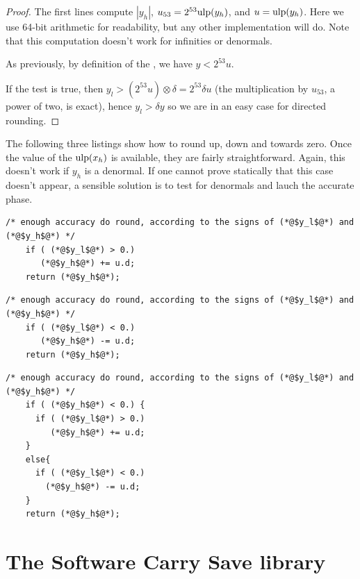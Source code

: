\begin{proof}
  The first lines compute $|y_h|$, $u_{53}=2^{53}\mbox{ulp}(y_h)$, and
  $u=\mbox{ulp}(y_h)$. Here we use 64-bit arithmetic for readability, but
  any other implementation will do. Note that this computation doesn't
  work for infinities or denormals.
  
  As previously, by definition of the \ulp, we have  $y<2^{53}u$.
  
  If the test is true, then $y_l>(2^{53}u)\otimes \delta = 
  2^{53} \delta u $ (the multiplication by $u_{53}$, a power of
  two, is exact), hence $y_l>\delta y$ so we are in an easy case for directed rounding.

\end{proof}


The following three listings show how to round up, down and towards
zero. Once the value of the $\mbox{ulp}(x_h)$ is available, they are fairly
straightforward. Again, this doesn't work if $y_h$ is a denormal. If
one cannot prove statically that this case doesn't appear, a sensible solution
is to test for denormals and lauch the accurate phase.


\begin{lstlisting}[caption={Rounding up}, firstnumber=1]
    /* enough accuracy do round, according to the signs of (*@$y_l$@*) and (*@$y_h$@*) */
    if ( (*@$y_l$@*) > 0.)
       (*@$y_h$@*) += u.d;
    return (*@$y_h$@*);
\end{lstlisting}

\begin{lstlisting}[caption={Rounding down}, firstnumber=1]
    /* enough accuracy do round, according to the signs of (*@$y_l$@*) and (*@$y_h$@*) */
    if ( (*@$y_l$@*) < 0.)
       (*@$y_h$@*) -= u.d;
    return (*@$y_h$@*);
\end{lstlisting}


\begin{lstlisting}[caption={Rounding towards zero}, firstnumber=1]
    /* enough accuracy do round, according to the signs of (*@$y_l$@*) and (*@$y_h$@*) */
    if ( (*@$y_h$@*) < 0.) {
      if ( (*@$y_l$@*) > 0.)
         (*@$y_h$@*) += u.d;
    }
    else{
      if ( (*@$y_l$@*) < 0.)
        (*@$y_h$@*) -= u.d;
    }
    return (*@$y_h$@*);
\end{lstlisting}








\section{The Software Carry Save library}

